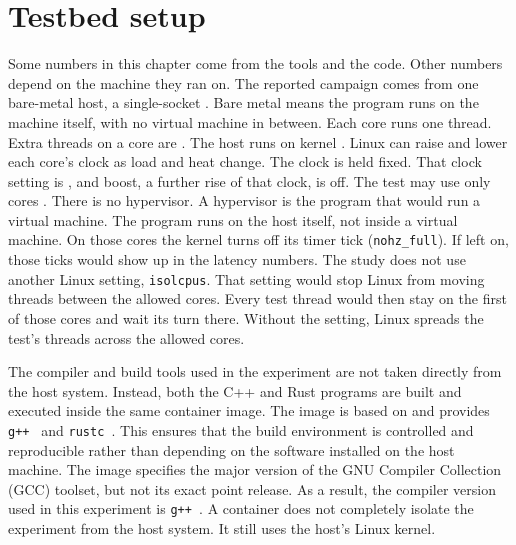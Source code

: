\documentclass[english,oneside,a4paper,censored,csm,software-track-2020]{HYthesisML}
\begin{document}
\section{Testbed setup\label{sec:testbed}}
Some numbers in this chapter come from the tools and the code. Other
numbers depend on the machine they ran on. The reported campaign comes from
one bare-metal host, a single-socket \MainCpu{}. Bare metal means the program runs on the machine itself,
with no virtual machine in between. Each core runs one
thread. Extra threads on a core are \MainSmt{}. The host runs
\MainHostDistro{} on kernel \MainKernel{}. Linux can raise and
lower each core's clock as load and heat change. The clock is held
fixed. That clock setting is \MainGovernor{}, and boost, a further rise of that clock, is off. The
test may use only cores \MainPinned{}. There is no hypervisor. A hypervisor
is the program that would run a virtual machine. The
program runs on the host itself, not inside a virtual machine. On those
cores the kernel turns off its timer tick (\texttt{nohz\_full}).
If left on, those ticks would show up in the latency numbers. The study does not use another Linux setting, \texttt{isolcpus}. That setting
would stop Linux from moving threads between the allowed cores. Every test
thread would then stay on the first of those cores and wait its turn there.
Without the setting, Linux spreads the test's threads across the allowed cores.

The compiler and build tools used in the experiment are not taken directly
from the host system. Instead, both the C++ and Rust programs are built and
executed inside the same container image. The image is based on \MainDistro{}
and provides \texttt{g++~\MainGpp} and \texttt{rustc~\MainRustc}. This
ensures that the build environment is controlled and reproducible rather
than depending on the software installed on the host machine. The image specifies the major
version of the GNU Compiler Collection (GCC) toolset, but not its exact point release. As a
result, the compiler version used in this experiment is \texttt{g++~\MainGpp}. A container
does not completely isolate the experiment from the host system. It still uses the host's
Linux kernel.
\end{document}
